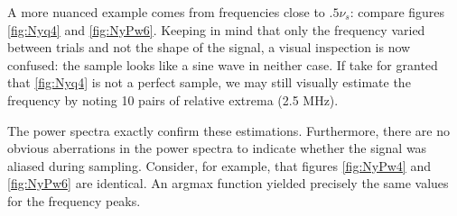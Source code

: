 \documentclass[a4paper]{article}
\begin{document}
A more nuanced example comes from frequencies close to $.5 \nu_s$: compare figures \ref{fig:Nyq4} and \ref{fig:NyPw6}. Keeping in mind that only the frequency varied between trials and not the shape of the signal, a visual inspection is now confused: the sample looks like a sine wave in neither case. If take for granted that \ref{fig:Nyq4} is not a perfect sample, we may still visually estimate the frequency by noting 10 pairs of relative extrema (2.5 MHz). 



The power spectra exactly confirm these estimations. Furthermore, there are no obvious aberrations in the power spectra to indicate whether the signal was aliased during sampling. Consider, for example, that figures \ref{fig:NyPw4} and \ref{fig:NyPw6} are identical. An argmax function yielded precisely the same values for the frequency peaks.

\end{document}
